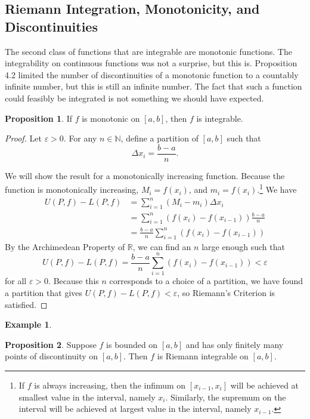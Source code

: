\documentclass{article}
\newcommand{\N}{\mathbb{N}}
\newcommand{\R}{\mathbb{R}}
\theoremstyle{definition}
\newtheorem{proposition}{Proposition}[section]
\newtheorem{example}{Example}[section]
\begin{document}
\subsection{Riemann Integration, Monotonicity, and Discontinuities}
The second class of functions that are integrable are monotonic functions. The integrability on continuous functions was not a surprise, but this is. Proposition 4.2 limited the number of discontinuities of a monotonic function to a countably infinite number, but this is still an infinite number. The fact that such a function could feasibly be integrated is not something we should have expected. 
 \begin{proposition}
 	If $ f $ is monotonic on $ [a,b] $, then $ f $ is integrable. 
 \end{proposition}
 \begin{proof}
	Let $ \varepsilon>0 $. For any $ n\in\N $, define a partition of $ [a,b] $ such that $$ \Delta x_i=\frac{b-a}{n}.$$
	
	We will show the result for a monotonically increasing function. Because the function is monotonically increasing, $ M_i=f(x_i) $, and $ m_i=f(x_i) $.\footnote{If $ f $ is always increasing, then the infimum on $ [x_{i-1},x_i] $ will be achieved at  smallest value in the interval, namely $ x_i $. Similarly, the supremum on the interval will be achieved at  largest value in the interval, namely $ x_{i-1} $.} We have \begin{align*}
		U(P,f)-L(P,f)&=\sum_{i=1}^{n}(M_i-m_i)\Delta x_i\\&=\sum_{i=1}^{n}(f(x_i)-f(x_{i-1}))\frac{b-a}{n}\\&=\frac{b-a}{n}\sum_{i=1}^{n}(f(x_i)-f(x_{i-1}))
	\end{align*}
	By the Archimedean Property of $ \R $, we can find an $ n $ large enough such that $$U(P,f)-L(P,f)=\frac{b-a}{n}\sum_{i=1}^{n}(f(x_i)-f(x_{i-1}))<\varepsilon $$ for all $ \varepsilon>0 $. Because this $ n $ corresponds to a choice of a partition, we have found a partition that gives $ U(P,f)-L(P,f)<\varepsilon$, so Riemann's Criterion is satisfied. 
 \end{proof}
\begin{example}
	
\end{example}
\begin{proposition}
	Suppose $ f $ is bounded on $ [a,b] $ and has only finitely many points of discontinuity on $ [a,b] $. Then $ f $ is Riemann integrable on $ [a,b] $.
\end{proposition}
\end{document}
